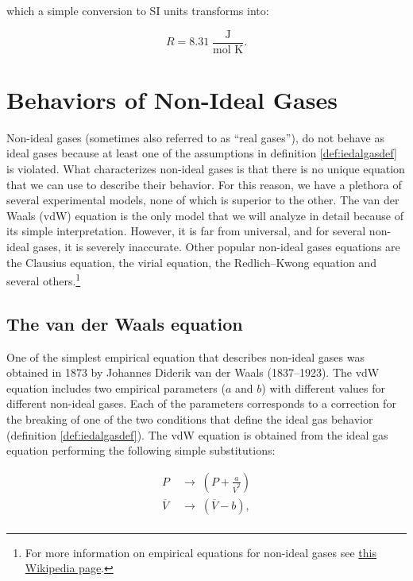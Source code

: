 \documentclass[
  9pt,
]{extbook}
\newcounter{none} %
\theoremstyle{definition}
\theoremstyle{definition}
\theoremstyle{definition}
\theoremstyle{definition}
\theoremstyle{remark}
\begin{document}
which a simple conversion to SI units transforms into:

\begin{equation}
R=8.31\;\frac{\text{J}}{\text{mol K}}.
\label{eq:RvalueSI}
\end{equation}

\section{Behaviors of Non-Ideal Gases}\label{behaviors-of-non-ideal-gases}

Non-ideal gases (sometimes also referred to as ``real gases''), do not behave as ideal gases because at least one of the assumptions in definition \ref{def:iedalgasdef} is violated. What characterizes non-ideal gases is that there is no unique equation that we can use to describe their behavior. For this reason, we have a plethora of several experimental models, none of which is superior to the other. The van der Waals (vdW) equation is the only model that we will analyze in detail because of its simple interpretation. However, it is far from universal, and for several non-ideal gases, it is severely inaccurate. Other popular non-ideal gases equations are the Clausius equation, the virial equation, the Redlich--Kwong equation and several others.\footnote{For more information on empirical equations for non-ideal gases see \href{https://en.wikipedia.org/wiki/Real_gas}{this Wikipedia page}.}

\subsection{The van der Waals equation}\label{the-van-der-waals-equation}

One of the simplest empirical equation that describes non-ideal gases was obtained in 1873 by Johannes Diderik van der Waals (1837--1923). The vdW equation includes two empirical parameters (\(a\) and \(b\)) with different values for different non-ideal gases. Each of the parameters corresponds to a correction for the breaking of one of the two conditions that define the ideal gas behavior (definition \ref{def:iedalgasdef}). The vdW equation is obtained from the ideal gas equation performing the following simple substitutions:

\begin{equation}
\begin{aligned}
P & \;\rightarrow\;\left( P + \frac{a}{\overline{V}^2} \right)\\
\overline{V} & \;\rightarrow\;\left( \overline{V} - b\right),\\
\end{aligned}
\label{eq:vdWeq1}
\end{equation}
\end{document}
